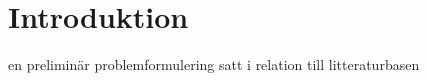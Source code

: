 \chapter{Introduktion}\label{cha:intro}

en preliminär problemformulering satt i relation till litteraturbasen
